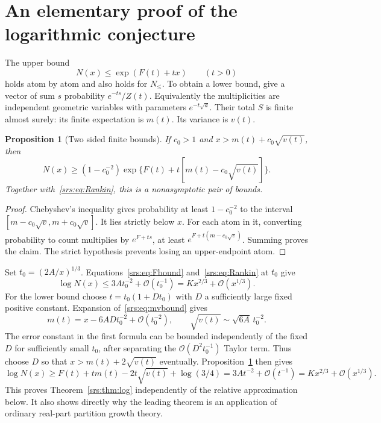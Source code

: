 \documentclass[11pt]{article}
\numberwithin{equation}{section}
\newtheorem{proposition}[theorem]{Proposition}
\theoremstyle{remark}\newtheorem{remark}[theorem]{Remark}
\newcommand{\Oh}{\mathcal O}
\begin{document}
\section{An elementary proof of the logarithmic conjecture}\label{srs:sec:log}
The upper bound
\begin{equation}
 N(x)\le \exp(F(t)+tx)\qquad(t>0)\label{srs:eq:Rankin}
\end{equation}
holds atom by atom and also holds for $N_{\le}$. To obtain a lower bound, give a vector of sum $s$ probability $e^{-ts}/Z(t)$. Equivalently the multiplicities are independent geometric variables with parameters $e^{-t\sqrt d}$. Their total $S$ is finite almost surely: its finite expectation is $m(t)$. Its variance is $v(t)$.

\begin{proposition}[Two sided finite bounds]\label{srs:prop:finite}
If $c_0>1$ and $x>m(t)+c_0\sqrt{v(t)}$, then
\begin{equation}
 N(x)\ge (1-c_0^{-2})
 \exp\{F(t)+t[m(t)-c_0\sqrt{v(t)}]\}.\label{srs:eq:Chebyshev}
\end{equation}
Together with~\eqref{srs:eq:Rankin}, this is a nonasymptotic pair of bounds.
\end{proposition}
\begin{proof}
Chebyshev's inequality gives probability at least $1-c_0^{-2}$ to the interval $[m-c_0\sqrt v,m+c_0\sqrt v]$. It lies strictly below $x$. For each atom in it, converting probability to count multiplies by $e^{F+ts}$, at least $e^{F+t(m-c_0\sqrt v)}$. Summing proves the claim. The strict hypothesis prevents losing an upper-endpoint atom.
\end{proof}

Set $t_0=(2A/x)^{1/3}$. Equations~\eqref{srs:eq:Fbound} and~\eqref{srs:eq:Rankin} at $t_0$ give
\[
 \log N(x)\le 3A t_0^{-2}+\Oh(t_0^{-1})=Kx^{2/3}+\Oh(x^{1/3}).
\]
For the lower bound choose $t=t_0(1+Dt_0)$ with $D$ a sufficiently large fixed positive constant. Expansion of~\eqref{srs:eq:mvbound} gives
\[
 m(t)=x-6ADt_0^{-2}+\Oh(t_0^{-2}),\qquad
 \sqrt{v(t)}\sim\sqrt{6A}\,t_0^{-2}.
\]
The error constant in the first formula can be bounded independently of the fixed $D$ for sufficiently small $t_0$, after separating the $\Oh(D^2t_0^{-1})$ Taylor term. Thus choose $D$ so that $x>m(t)+2\sqrt{v(t)}$ eventually. Proposition~\ref{srs:prop:finite} then gives
\[
 \log N(x)\ge F(t)+tm(t)-2t\sqrt{v(t)}+\log(3/4)
 =3At^{-2}+\Oh(t^{-1})=Kx^{2/3}+\Oh(x^{1/3}).
\]
This proves Theorem~\ref{srs:thm:log} independently of the relative approximation below. It also shows directly why the leading theorem is an application of ordinary real-part partition growth theory.
\end{document}
